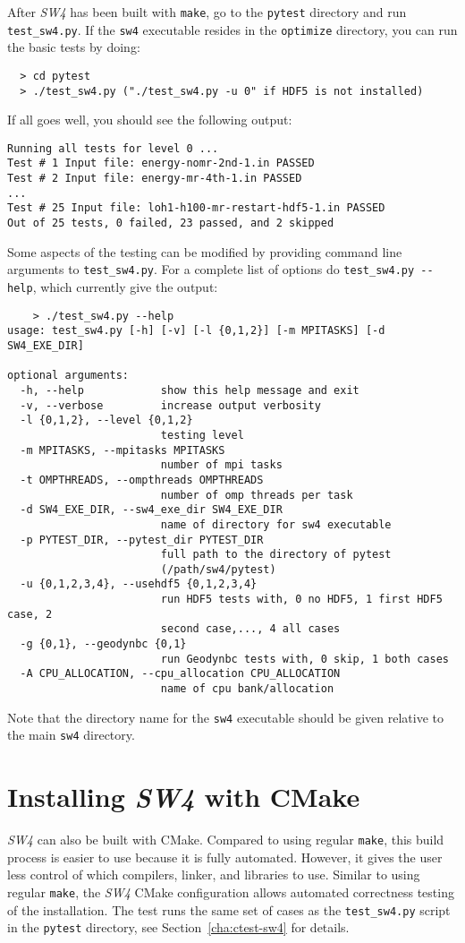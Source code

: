 \documentclass[11pt]{article}
\begin{document}
After \emph{SW4} has been built with \verb+make+, go to the \verb+pytest+ directory and run
\verb+test_sw4.py+. If the \verb+sw4+ executable resides in the \verb+optimize+ directory, you can
run the basic tests by doing:
\begin{verbatim}
  > cd pytest
  > ./test_sw4.py ("./test_sw4.py -u 0" if HDF5 is not installed)
\end{verbatim}
If all goes well, you should see the following output:
\begin{verbatim}
Running all tests for level 0 ...
Test # 1 Input file: energy-nomr-2nd-1.in PASSED
Test # 2 Input file: energy-mr-4th-1.in PASSED
...
Test # 25 Input file: loh1-h100-mr-restart-hdf5-1.in PASSED
Out of 25 tests, 0 failed, 23 passed, and 2 skipped
\end{verbatim}
Some aspects of the testing can be modified by providing command line arguments to
\verb+test_sw4.py+. For a complete list of options do \verb+test_sw4.py --help+, which currently
give the output:
\begin{verbatim}
    > ./test_sw4.py --help
usage: test_sw4.py [-h] [-v] [-l {0,1,2}] [-m MPITASKS] [-d SW4_EXE_DIR]

optional arguments:
  -h, --help            show this help message and exit
  -v, --verbose         increase output verbosity
  -l {0,1,2}, --level {0,1,2}
                        testing level
  -m MPITASKS, --mpitasks MPITASKS
                        number of mpi tasks
  -t OMPTHREADS, --ompthreads OMPTHREADS
                        number of omp threads per task
  -d SW4_EXE_DIR, --sw4_exe_dir SW4_EXE_DIR
                        name of directory for sw4 executable
  -p PYTEST_DIR, --pytest_dir PYTEST_DIR
                        full path to the directory of pytest
                        (/path/sw4/pytest)
  -u {0,1,2,3,4}, --usehdf5 {0,1,2,3,4}
                        run HDF5 tests with, 0 no HDF5, 1 first HDF5 case, 2
                        second case,..., 4 all cases
  -g {0,1}, --geodynbc {0,1}
                        run Geodynbc tests with, 0 skip, 1 both cases
  -A CPU_ALLOCATION, --cpu_allocation CPU_ALLOCATION
                        name of cpu bank/allocation
\end{verbatim}
Note  that the directory name for the \verb+sw4+ executable should be given relative to the main
\verb+sw4+ directory.

\section{Installing \emph{SW4} with CMake}\label{cha:installing-cmake-sw4}
\emph{SW4} can also be built with CMake. Compared to using regular {\tt make}, this build process is
easier to use because it is fully automated. However, it gives the user less control of which
compilers, linker, and libraries to use. Similar to using regular {\tt make}, the \emph{SW4} CMake
configuration allows automated correctness testing of the installation. The test runs the same set
of cases as the \verb+test_sw4.py+ script in the \verb+pytest+ directory, see
Section~\ref{cha:ctest-sw4} for details.
\end{document}

